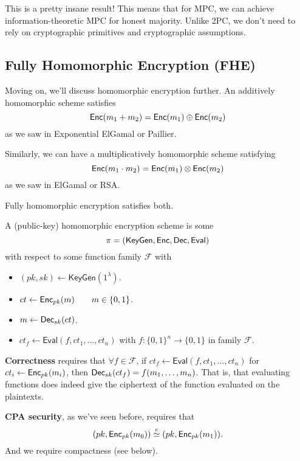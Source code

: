
This is a pretty insane result! This means that for MPC, we can achieve information-theoretic MPC for honest majority. Unlike 2PC, we don't need to rely on cryptographic primitives and cryptographic assumptions.

\subsection{Fully Homomorphic Encryption (FHE)}
Moving on, we'll discuss homomorphic encryption further. An additively homomorphic scheme satisfies
\[\operatorname{\mathsf{Enc}}(m_1 + m_2) = \operatorname{\mathsf{Enc}}(m_1) \oplus \operatorname{\mathsf{Enc}}(m_2)\]
as we saw in Exponential ElGamal or Paillier.

Similarly, we can have a multiplicatively homomorphic scheme satisfying
\[\operatorname{\mathsf{Enc}}(m_1 \cdot m_2) = \operatorname{\mathsf{Enc}}(m_1) \otimes \operatorname{\mathsf{Enc}}(m_2)\]
as we saw in ElGamal or RSA.

Fully homomorphic encryption satisfies both.
\begin{definition}\label{def:fhe}
    A (public-key) homomorphic encryption scheme is some
    \[\pi = (\mathsf{KeyGen}, \operatorname{\mathsf{Enc}}, \operatorname{\mathsf{Dec}}, \mathsf{Eval})\]
    with respect to some function family $\mathcal{F}$ with
    \begin{itemize}
        \item $(pk, sk)\leftarrow \mathsf{KeyGen}(1^\lambda)$.
        \item $ct\leftarrow \operatorname{\mathsf{Enc}}_{pk}(m)\qquad m\in \{0, 1\}$.
        \item $m\leftarrow \operatorname{\mathsf{Dec}}_{sk}(ct)$.
        \item $ct_f\leftarrow \mathsf{Eval}(f, ct_1, \dots, ct_n)$ with $f : \{0, 1\}^n\to \{0, 1\}$ in family $\mathcal{F}$.
    \end{itemize}

    \textbf{Correctness} requires that $\forall f\in \mathcal{F}$, if $ct_f \leftarrow \mathsf{Eval}(f, ct_1, \dots, ct_n)$ for $ct_i\leftarrow \operatorname{\mathsf{Enc}}_{pk}(m_i)$, then $\operatorname{\mathsf{Dec}}_{sk}(ct_f) = f(m_1, \dots, m_n)$. That is, that evaluating functions does indeed give the ciphertext of the function evaluated on the plaintexts.

    \textbf{CPA security}, as we've seen before, requires that
    \[(pk, \operatorname{\mathsf{Enc}}_{pk}(m_0))\overset{c}{\simeq}(pk, \operatorname{\mathsf{Enc}}_{pk}(m_1)).\]
    And we require compactness (see below).
\end{definition}

